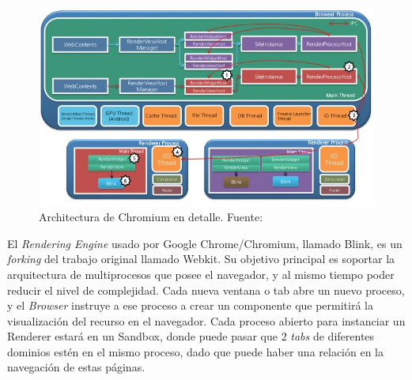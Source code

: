     \begin{figure}[h!t]
        \centering
        \includegraphics[scale=0.65]{figures/chromium-rendering-pipeline-28-638.jpg}
        \caption{Architectura de Chromium en detalle. Fuente: \cite{ChrRenderPipe}}
        \label{fig:archGC2}
    \end{figure}

    El \textit{Rendering Engine} usado por Google Chrome/Chromium, llamado Blink, es un \textit{forking} del trabajo original llamado Webkit. Su objetivo principal es soportar la arquitectura de multiprocesos que posee el navegador, y al mismo tiempo poder reducir el nivel de complejidad. Cada nueva ventana o tab abre un nuevo proceso, y el \textit{Browser} instruye a ese proceso a crear un componente que permitirá la visualización del recurso en el navegador. Cada proceso abierto para instanciar un Renderer estará en un Sandbox, donde puede pasar que 2 \textit{tabs} de diferentes dominios estén en el mismo proceso, dado que puede haber una relación en la navegación de estas páginas.




